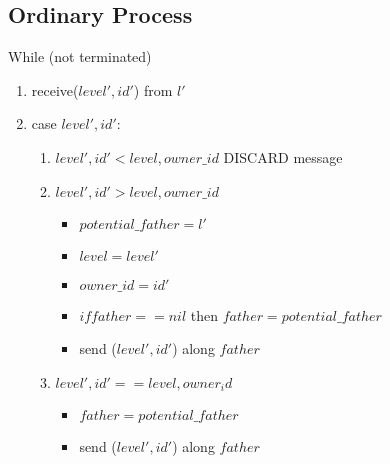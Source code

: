 \documentclass{article}
\begin{document}
\subsection*{Ordinary Process}
While (not terminated)
\begin{enumerate}
    \item receive(\(level', id'\)) from \(l'\)
    \item case \(level', id'\):
    \begin{enumerate}
        \item \(level', id' < level, owner\_id\) DISCARD message
        \item \(level', id' > level, owner\_id\)
        \begin{itemize}
            \item \(potential\_father = l'\)
            \item \(level = level'\)
            \item \(owner\_id = id'\)
            \item \(if father == nil\) then \(father = potential\_father\)
            \item send (\(level',id'\)) along \(father\)
        \end{itemize}
        \item \(level', id' == level, owner_id\)
        \begin{itemize}
            \item \(father = potential\_father\)
            \item send (\(level',id'\)) along \(father\)
        \end{itemize}
    \end{enumerate}
\end{enumerate}
\end{document}
